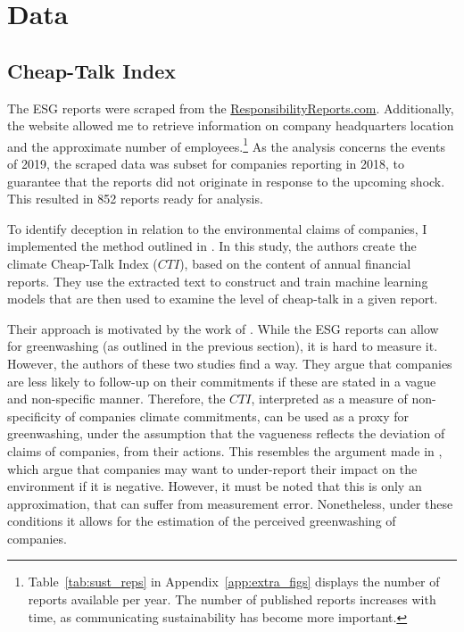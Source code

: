 \documentclass[12pt]{article}
\begin{document}
\section{Data}\label{sect:data}

\subsection{Cheap-Talk Index}

The ESG reports were scraped from the \href{https://responsibilityreports.com}{ResponsibilityReports.com}. Additionally, the website allowed me to retrieve information on company headquarters location and the approximate number of employees.\footnote{Table~\ref{tab:sust_reps} in Appendix~\ref{app:extra_figs} displays the number of reports available per year. The number of published reports increases with time, as communicating sustainability has become more important.} As the analysis concerns the events of 2019, the scraped data was subset for companies reporting in 2018, to guarantee that the reports did not originate in response to the upcoming shock. This resulted in 852 reports ready for analysis. 

To identify deception in relation to the environmental claims of companies, I implemented the method outlined in \textcite{binglerHowCheapTalk2024}. In this study, the authors create the climate Cheap-Talk Index ($CTI$), based on the content of annual financial reports. They use the extracted text to construct and train machine learning models that are then used to examine the level of cheap-talk in a given report. 

Their approach is motivated by the work of \textcite{coenAreCorporateClimate2022, ramusWhenAreCorporate2005}. While the ESG reports can allow for greenwashing (as outlined in the previous section), it is hard to measure it. However, the authors of these two studies find a way. They argue that companies are less likely to follow-up on their commitments if these are stated in a vague and non-specific manner. Therefore, the $CTI$, interpreted as a measure of non-specificity of companies climate commitments, can be used as a proxy for greenwashing, under the assumption that the vagueness reflects the deviation of claims of companies, from their actions. This resembles the argument made in \textcite{binglerCheapTalkCherrypicking2022,marquisScrutinyNormsSelective2016}, which argue that companies may want to under-report their impact on the environment if it is negative. However, it must be noted that this is only an approximation, that can suffer from measurement error. Nonetheless, under these conditions it allows for the estimation of the perceived greenwashing of companies. 
\end{document}
